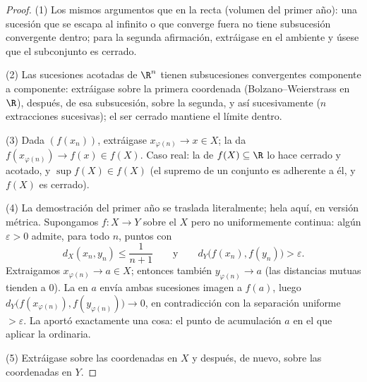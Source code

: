 \begin{proof}
(1) Los mismos argumentos que en la recta (volumen del primer año):
una sucesión que se escapa al infinito o que converge fuera no tiene
subsucesión convergente dentro; para la segunda afirmación,
extráigase en el  ambiente y úsese que el subconjunto es
cerrado.

(2) Las sucesiones acotadas de $\R^n$ tienen subsucesiones
convergentes componente a componente: extráigase sobre la primera
coordenada (Bolzano--Weierstrass en $\R$), después, de esa
subsucesión, sobre la segunda, y así sucesivamente ($n$ extracciones
sucesivas); el ser cerrado mantiene el límite dentro.

(3) Dada $(f(x_n))$, extráigase $x_{\varphi(n)} \to x \in X$; la
 da $f(x_{\varphi(n)}) \to f(x) \in f(X)$. Caso real: la
 de $f(X) \subseteq \R$ lo hace cerrado y acotado, y $\sup
f(X) \in f(X)$ (el supremo de un conjunto es adherente a él, y $f(X)$
es cerrado).

(4) La demostración del primer año se traslada literalmente; hela
aquí, en versión métrica. Supongamos $f \colon X \to Y$ 
sobre el  $X$ pero no uniformemente continua: algún
$\varepsilon > 0$ admite, para todo $n$, puntos con
\[
d_X(x_n, y_n) \leq \frac{1}{n+1}
\qquad\text{y}\qquad
d_Y\bigl(f(x_n), f(y_n)\bigr) > \varepsilon .
\]
Extraigamos $x_{\varphi(n)} \to a \in X$; entonces también
$y_{\varphi(n)} \to a$ (las distancias mutuas tienden a $0$). La
 en $a$ envía ambas sucesiones imagen a $f(a)$, luego
$d_Y\bigl(f(x_{\varphi(n)}), f(y_{\varphi(n)})\bigr) \to 0$, en
contradicción con la separación uniforme $> \varepsilon$. La
 aportó exactamente una cosa: el punto de acumulación
$a$ en el que aplicar la  ordinaria.

(5) Extráigase sobre las coordenadas en $X$ y después, de nuevo,
sobre las coordenadas en $Y$.
\end{proof}

